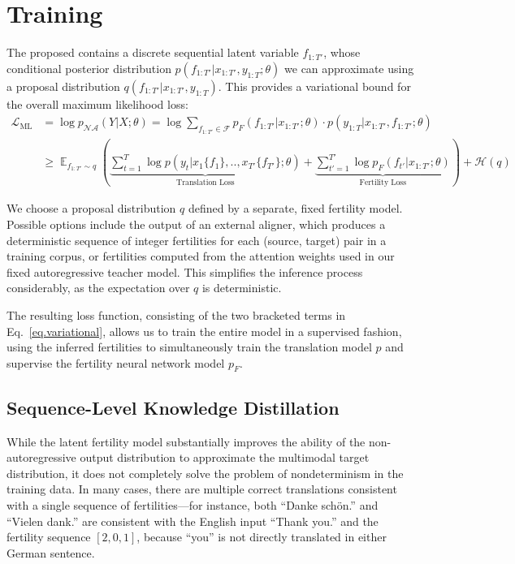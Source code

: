 \documentclass{article} %
\begin{document}
\section{Training}
The proposed \model{} contains a discrete sequential latent variable $f_{1:T'}$, whose conditional posterior distribution $p(f_{1:T'} | x_{1:T'}, y_{1:T}; \theta)$ we can approximate using a proposal distribution $q(f_{1:T'} | x_{1:T'}, y_{1:T})$. This provides a variational bound for the overall maximum likelihood loss:
\begin{equation}
\label{eq.variational}
\begin{split}
\mathcal{L}_{\text{ML}} &= \log p_{\mathcal{NA}}(Y|X; \theta) = \log \sum_{f_{1:T'}\in \mathcal{F}}{p_F(f_{1:T'}|x_{1:T'}; \theta)\cdot p(y_{1:T} | x_{1:T'}, f_{1:T'}; \theta)} \\
&\geq \mathop{\mathbb{E}}_{f_{1:T'} \sim q}\left(\underbrace{\sum_{t=1}^T\log p(y_t| x_1\{f_1\}, .., x_{T'}\{f_{T'}\}; \theta)}_{\text{Translation Loss}} + \underbrace{\sum_{t'=1}^{T'}\log p_F(f_{t'}|x_{1:T'}; \theta)}_{\text{Fertility Loss}} \right) + \mathcal{H}(q)
\end{split}
\end{equation}

We choose a proposal distribution $q$ defined by a separate, fixed fertility model. Possible options include the output of an external aligner, which produces a deterministic sequence of integer fertilities for each (source, target) pair in a training corpus, or fertilities computed from the attention weights used in our fixed autoregressive teacher model. This simplifies the inference process considerably, as the expectation over $q$ is deterministic.

The resulting loss function, consisting of the two bracketed terms in Eq.~\ref{eq.variational}, allows us to train the entire model in a supervised fashion, using the inferred fertilities to simultaneously train the translation model $p$ and supervise the fertility neural network model $p_F$.

\subsection{Sequence-Level Knowledge Distillation}\label{sec.seqkd}

While the latent fertility model substantially improves the ability of the non-autoregressive output distribution to approximate the multimodal target distribution, it does not completely solve the problem of nondeterminism in the training data. In many cases, there are multiple correct translations consistent with a single sequence of fertilities---for instance, both ``Danke sch\"{o}n.'' and ``Vielen dank.'' are consistent with the English input ``Thank you.'' and the fertility sequence $[2, 0, 1]$, because ``you'' is not directly translated in either German sentence.
\end{document}
